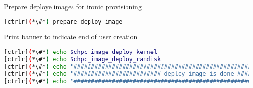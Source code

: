 	
	Prepare deploye images for ironic provisioning 

\begin{lstlisting}[language=bash,keywords={},upquote=true]
[ctrlr](*\#*) prepare_deploy_image
\end{lstlisting}

	
	Print banner to indicate end of user creation

\begin{lstlisting}[language=bash,keywords={},upquote=true]
[ctrlr](*\#*) echo $chpc_image_deploy_kernel
[ctrlr](*\#*) echo $chpc_image_deploy_ramdisk
[ctrlr](*\#*) echo "########################################################################"
[ctrlr](*\#*) echo "######################### deploy image is done #########################"
[ctrlr](*\#*) echo "########################################################################"
\end{lstlisting}


